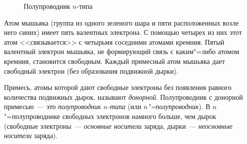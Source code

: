 \documentclass[main.tex]{subfiles}
\begin{document}
\begin{NoHyper}
\begin{figure}[H]
\caption{Полупроводник $n$-типа}
\label{fig:p131}
\end{figure}

Атом мышьяка (группа из одного зеленого шара и пяти расположенных возле него синих) имеет пять валентных электрона. С помощью четырех из них этот атом <<связывается>> с четырьмя соседними атомами кремния. Пятый валентный электрон мышьяка, не формирующий связь с каким"=либо атомом кремния, становится свободным.
Каждый примесный атом мышьяка дает свободный электрон (без образования подвижной дырки).

Примесь, атомы которой дают свободные электроны без появления равного количества подвижных дырок, называют \emph{донорной}. Полупроводник с донорной примесью~--- это \emph{полупроводник $n$-типа} (или \emph{$n$"=полупроводник}). В $n$"=полупроводнике свободных электронов намного больше, чем дырок (свободные электроны~--- \emph{основные носители} заряда, дырки~--- \emph{неосновные носители} заряда). 























\end{NoHyper}
\end{document}

